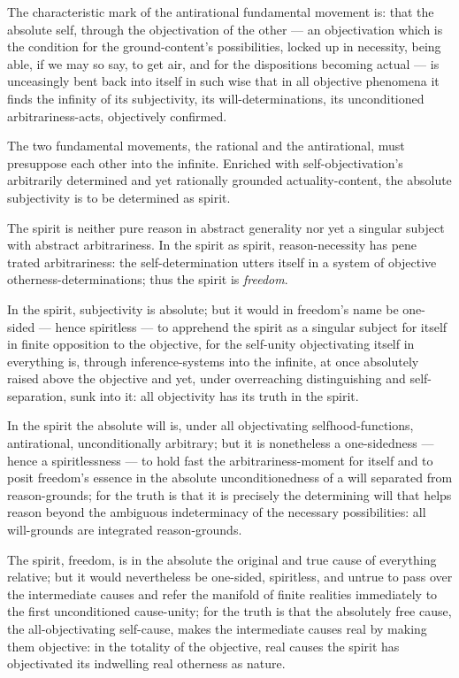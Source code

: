 \documentclass[12pt]{book}
\begin{document}
The characteristic mark of the antirational fundamental movement is:
that the absolute self, through the objectivation of the other ---
an objectivation which is the condition for the ground-content's
possibilities, locked up in necessity, being able, if we may so say,
to get air, and for the dispositions becoming actual --- is
unceasingly bent back into itself in such wise that in all objective
phenomena it finds the infinity of its subjectivity, its
will-determinations, its unconditioned arbitrariness-acts,
objectively confirmed.

The two fundamental movements, the rational and the antirational,
must presuppose each other into the infinite. Enriched with
self-objectivation's arbitrarily determined and yet rationally
grounded actuality-content, the absolute subjectivity is to be
determined as spirit.

The spirit is neither pure reason in abstract generality nor yet a
singular subject with abstract arbitrariness. In the spirit as
spirit, reason-necessity has pene\-%
trated arbitrariness: the self-determination utters itself in a
system of objective otherness-determinations; thus the spirit is
\emph{freedom}.

In the spirit, subjectivity is absolute; but it would in freedom's
name be one-sided --- hence spiritless --- to apprehend the spirit
as a singular subject for itself in finite opposition to the
objective, for the self-unity objectivating itself in everything is,
through inference-systems into the infinite, at once absolutely
raised above the objective and yet, under overreaching
distinguishing and self-separation, sunk into it: all objectivity
has its truth in the spirit.

In the spirit the absolute will is, under all objectivating
selfhood-functions, antirational, unconditionally arbitrary; but it
is nonetheless a one-sidedness --- hence a spiritlessness --- to
hold fast the arbitrariness-moment for itself and to posit freedom's
essence in the absolute unconditionedness of a will separated from
reason-grounds; for the truth is that it is precisely the
determining will that helps reason beyond the ambiguous
indeterminacy of the necessary possibilities: all will-grounds are
integrated reason-grounds.

The spirit, freedom, is in the absolute the original and true cause
of everything relative; but it would nevertheless be one-sided,
spiritless, and untrue to pass over the intermediate causes and
refer the manifold of finite realities immediately to the first
unconditioned cause-unity; for the truth is that the absolutely free
cause, the all-objectivating self-cause, makes the intermediate
causes real by making them objective: in the totality of the
objective, real causes the spirit has objectivated its indwelling
real otherness as nature.
\end{document}
